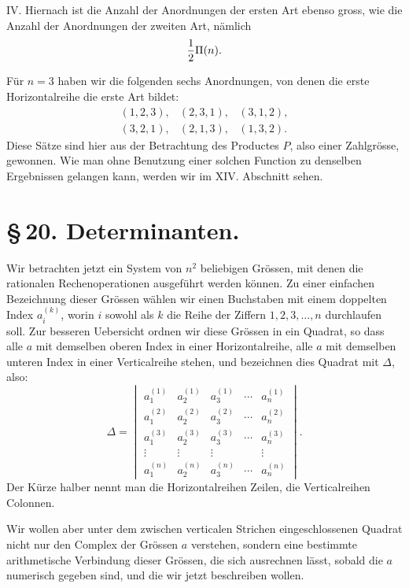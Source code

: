 \documentclass[11pt]{article}
\begin{document}
IV. Hiernach ist die Anzahl der Anordnungen der ersten Art ebenso gross, wie die Anzahl der Anordnungen der zweiten Art, nämlich
\[
{1\over2}\Pi(n).
\]

Für \(n=3\) haben wir die folgenden sechs Anordnungen, von denen die erste Horizontalreihe die erste Art bildet:
\[
\begin{array}{ccc}
(1,2,3),&(2,3,1),&(3,1,2),\\
(3,2,1),&(2,1,3),&(1,3,2).
\end{array}
\]
Diese Sätze sind hier aus der Betrachtung des Productes \(P\), also einer Zahlgrösse, gewonnen. Wie man ohne Benutzung einer solchen Function zu denselben Ergebnissen gelangen kann, werden wir im XIV. Abschnitt sehen.

\section*{\S\,20. Determinanten.}

Wir betrachten jetzt ein System von \(n^2\) beliebigen Grössen, mit denen die rationalen Rechenoperationen ausgeführt werden können. Zu einer einfachen Bezeichnung dieser Grössen wählen wir einen Buchstaben mit einem doppelten Index \(a_i^{(k)}\), worin \(i\) sowohl als \(k\) die Reihe der Ziffern \(1,2,3,\ldots,n\) durchlaufen soll. Zur besseren Uebersicht ordnen wir diese Grössen in ein Quadrat, so dass alle \(a\) mit demselben oberen Index in einer Horizontalreihe, alle \(a\) mit demselben unteren Index in einer Verticalreihe stehen, und bezeichnen dies Quadrat mit \(\Delta\), also:
\begin{equation}
\Delta=
\begin{vmatrix}
a_1^{(1)}&a_2^{(1)}&a_3^{(1)}&\cdots&a_n^{(1)}\\
a_1^{(2)}&a_2^{(2)}&a_3^{(2)}&\cdots&a_n^{(2)}\\
a_1^{(3)}&a_2^{(3)}&a_3^{(3)}&\cdots&a_n^{(3)}\\
\vdots&\vdots&\vdots&&\vdots\\
a_1^{(n)}&a_2^{(n)}&a_3^{(n)}&\cdots&a_n^{(n)}
\end{vmatrix}.
\tag{1}
\end{equation}
Der Kürze halber nennt man die Horizontalreihen Zeilen, die Verticalreihen Colonnen.

Wir wollen aber unter dem zwischen verticalen Strichen eingeschlossenen Quadrat nicht nur den Complex der Grössen \(a\) verstehen, sondern eine bestimmte arithmetische Verbindung dieser Grössen, die sich ausrechnen lässt, sobald die \(a\) numerisch gegeben sind, und die wir jetzt beschreiben wollen.
\end{document}
